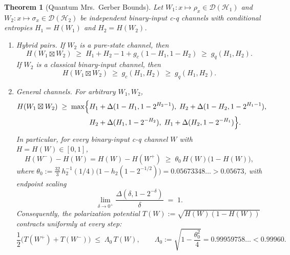 \documentclass[10pt,a4paper]{article}
\numberwithin{equation}{section}
\theoremstyle{plain}
\newtheorem{theorem}{Theorem}[section]
\theoremstyle{definition}
\theoremstyle{remark}
\newcommand{\cH}{\mathcal{H}}
\newcommand{\cD}{\mathcal{D}}
\begin{document}
\begin{theorem}[Quantum Mrs.\ Gerber Bounds]\label{thm:qmgl}
Let $W_1 : x \mapsto \rho_x \in \cD(\cH_1)$ and $W_2 : x \mapsto \sigma_x \in \cD(\cH_2)$ be independent binary-input c-q channels with conditional entropies $H_1 = H(W_1)$ and $H_2 = H(W_2)$.
\begin{enumerate}
\item[(a)] \emph{Hybrid pairs.} If $W_2$ is a pure-state channel, then
\begin{equation}\label{eq:qmgl-pure}
H(W_1 \boxtimes W_2) \;\ge\; H_1 + H_2 - 1 + g_c(1 - H_1, 1 - H_2) \;\ge\; g_q(H_1, H_2).
\end{equation}
If $W_2$ is a classical binary-input channel, then
\begin{equation}\label{eq:qmgl-classical}
H(W_1 \boxtimes W_2) \;\ge\; g_c(H_1, H_2) \;\ge\; g_q(H_1, H_2).
\end{equation}
\item[(b)] \emph{General channels.} For arbitrary $W_1, W_2$,
\begin{equation}\label{eq:four-branch}
\begin{aligned}
H(W_1 \boxtimes W_2) \;\ge\; \max\Bigl\{
&H_1 + \Delta(1 - H_1, 1 - 2^{H_2 - 1}),\;
H_2 + \Delta(1 - H_2, 1 - 2^{H_1 - 1}),\\
&H_2 + \Delta(H_1, 1 - 2^{-H_2}),\;
H_1 + \Delta(H_2, 1 - 2^{-H_1})
\Bigr\}.
\end{aligned}
\end{equation}
In particular, for every binary-input c-q channel $W$ with $H = H(W) \in [0,1]$,
\begin{equation}\label{eq:linear-splitting}
H(W^-) - H(W) = H(W) - H(W^+) \;\ge\; \theta_0\, H(W)\bigl(1 - H(W)\bigr),
\end{equation}
where $\theta_0 := \frac{32}{3}\, h_2^{-1}(1/4)\bigl(1 - h_2(1 - 2^{-1/2})\bigr) = 0.05673348\ldots > 0.05673$, with endpoint scaling
\begin{equation}\label{eq:endpoint-scaling}
\lim_{\delta \to 0^+} \frac{\Delta(\delta, 1 - 2^{-\delta})}{\delta} \;=\; 1.
\end{equation}
Consequently, the polarization potential $T(W) := \sqrt{H(W)(1 - H(W))}$ contracts uniformly at every step:
\begin{equation}\label{eq:potential-contraction}
\frac{1}{2}\bigl(T(W^+) + T(W^-)\bigr) \;\le\; \Lambda_0\, T(W), \qquad
\Lambda_0 := \sqrt{1 - \frac{\theta_0^2}{4}} = 0.99959758\ldots < 0.99960.
\end{equation}
\end{enumerate}
\end{theorem}
\end{document}
